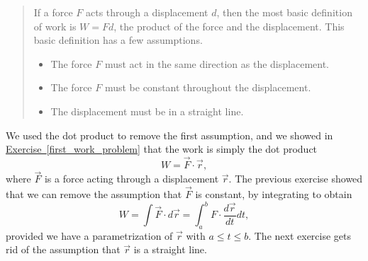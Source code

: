 \documentclass[10pt,]{book}
\theoremstyle{plain}
\theoremstyle{definition}
\theoremstyle{definition}
\theoremstyle{definition}
\theoremstyle{definition}
\theoremstyle{definition}
\numberwithin{equation}{section}
\begin{document}
\begin{quote}\hypertarget{blockquote-4}{}
If a force \(F\) acts through a displacement \(d\), then the most basic definition of work is \(W=Fd\), the product of the force and the displacement.  This basic definition has a few assumptions. \leavevmode%
\begin{itemize}[label=\textbullet]
\item{}The force \(F\) must act in the same direction as the displacement.%
\item{}The force \(F\) must be constant throughout the  displacement.%
\item{}The displacement must be in a straight line.%
\end{itemize}
%
\end{quote}
We used the dot product to remove the first assumption, and we showed in \hyperref[first_work_problem]{Exercise~\ref{first_work_problem}} that the work is simply the dot product%
\begin{equation*}
W=\vec F\cdot \vec r,
\end{equation*}
where \(\vec F\) is a force acting through a displacement \(\vec r\). The previous exercise showed that we can remove the assumption that \(\vec F\) is constant, by integrating to obtain%
\begin{equation*}
W=\int \vec F \cdot d\vec r = \int_a^b F\cdot \frac{d\vec r}{dt}dt,
\end{equation*}
provided we have a parametrization of \(\vec r\) with \(a\leq t\leq b\). The next exercise gets rid of the assumption that \(\vec r\) is a straight line.%
\end{document}
